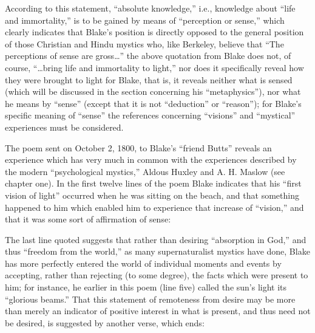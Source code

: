 
According to this statement, \enquote{absolute knowledge,} i.e., knowledge about
\enquote{life and immortality,} is to be gained by means of \enquote{perception or sense,} which clearly
indicates that Blake's position is directly opposed to the general position of those
Christian and Hindu mystics who, like Berkeley, believe that \enquote{The perceptions of sense are gross\dots}\supercite{keynes:william-blake}
the above quotation from Blake does not, of course, \enquote{\dots bring life and immortality to light,} nor does it specifically
reveal how they were brought to light for Blake, that is, it reveals neither
what is sensed (which will be discussed in the section concerning his \enquote{metaphysics}), nor
what he means by \enquote{sense} (except that it is not \enquote{deduction} or \enquote{reason}); for Blake's specific meaning of
\enquote{sense} the references concerning \enquote{visions} and \enquote{mystical} experiences must be considered.

The poem sent on October 2, 1800, to Blake's \enquote{friend Butts} reveals an experience which has very much in common with
the experiences described by the modern \enquote{psychological mystics,} Aldous Huxley and A. H. Maslow (see chapter one).
In the first twelve lines of the poem Blake indicates that his \enquote{first vision of light} occurred when he was sitting
on the beach, and that something happened to him which enabled him to experience that increase of \enquote{vision,} and that
it was some sort of affirmation of sense:

\clearpage

\label{self:26}


The last line quoted suggests that rather than desiring \enquote{absorption in God,} and thus \enquote{freedom from the world,}
as many supernaturalist mystics have done, Blake has more perfectly entered the world of individual moments and events
by accepting, rather than rejecting (to some degree), the facts which were present to him; for instance,
he earlier in this poem (line five) called the sun's light its \enquote{glorious beams.} That
this statement of remoteness from desire may be more than merely an indicator of positive interest in
what is present, and thus need not be desired, is suggested by another verse, which ends:

